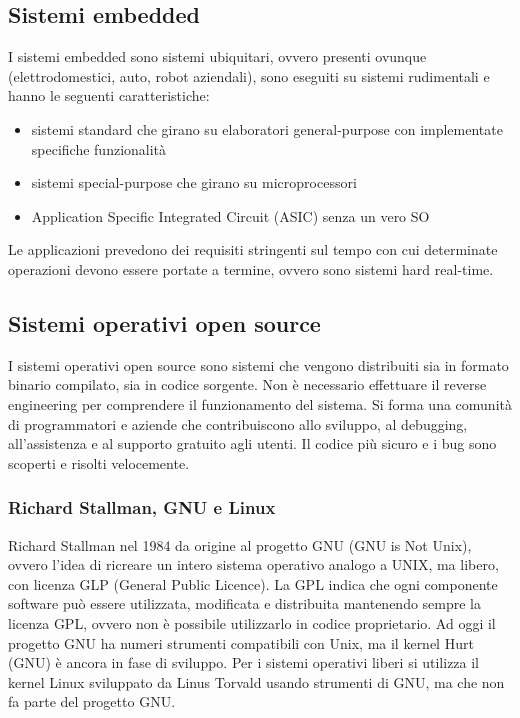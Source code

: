 \documentclass[a4paper]{article}
\begin{document}
\subsection{Sistemi embedded}
I sistemi embedded sono sistemi ubiquitari, ovvero presenti ovunque (elettrodomestici, auto, robot aziendali), sono eseguiti su
sistemi rudimentali e hanno le seguenti caratteristiche:
\begin{itemize}
	\item sistemi standard che girano su elaboratori general-purpose con implementate specifiche funzionalità
	\item sistemi special-purpose che girano su microprocessori
	\item Application Specific Integrated Circuit (ASIC) senza un vero SO
\end{itemize}
Le applicazioni prevedono dei requisiti stringenti sul tempo con cui determinate operazioni devono essere portate a termine, ovvero
sono sistemi hard real-time.

\subsection{Sistemi operativi open source}
I sistemi operativi open source sono sistemi che vengono distribuiti sia in formato binario compilato, sia in codice sorgente.
Non è necessario effettuare il reverse engineering per comprendere il funzionamento del sistema. Si forma una comunità di
programmatori e aziende che contribuiscono allo sviluppo, al debugging, all’assistenza e al supporto gratuito agli utenti.
Il codice più sicuro e i bug sono scoperti e risolti velocemente.

\subsubsection*{Richard Stallman, GNU e Linux}
Richard Stallman nel 1984 da origine al progetto GNU (GNU is Not Unix), ovvero l'idea di ricreare un intero sistema operativo
analogo a UNIX, ma libero, con licenza GLP (General Public Licence). La GPL indica che ogni componente software può essere
utilizzata, modificata e distribuita mantenendo sempre la licenza GPL, ovvero non è possibile utilizzarlo in codice proprietario.
Ad oggi il progetto GNU ha numeri strumenti compatibili con Unix, ma il kernel Hurt (GNU) è ancora in fase di sviluppo. Per i
sistemi operativi liberi si utilizza il kernel Linux sviluppato da Linus Torvald usando strumenti di GNU, ma che non fa parte
del progetto GNU.
\end{document}
